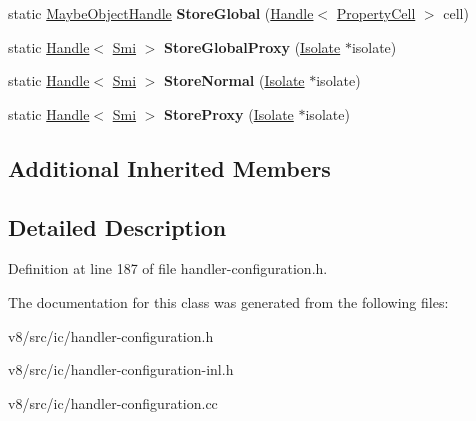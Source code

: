 \begin{DoxyCompactItemize}
\item 
\mbox{\label{classv8_1_1internal_1_1StoreHandler_a67ff02217ff0b7e1f3024b5b75705229}} 
static \mbox{\hyperlink{classv8_1_1internal_1_1MaybeObjectHandle}{Maybe\+Object\+Handle}} {\bfseries Store\+Global} (\mbox{\hyperlink{classv8_1_1internal_1_1Handle}{Handle}}$<$ \mbox{\hyperlink{classv8_1_1internal_1_1PropertyCell}{Property\+Cell}} $>$ cell)
\item 
\mbox{\label{classv8_1_1internal_1_1StoreHandler_a32b7371d227e63752e2739895810cc1f}} 
static \mbox{\hyperlink{classv8_1_1internal_1_1Handle}{Handle}}$<$ \mbox{\hyperlink{classv8_1_1internal_1_1Smi}{Smi}} $>$ {\bfseries Store\+Global\+Proxy} (\mbox{\hyperlink{classv8_1_1internal_1_1Isolate}{Isolate}} $\ast$isolate)
\item 
\mbox{\label{classv8_1_1internal_1_1StoreHandler_a16b1eb56c827571852da4f896218a31b}} 
static \mbox{\hyperlink{classv8_1_1internal_1_1Handle}{Handle}}$<$ \mbox{\hyperlink{classv8_1_1internal_1_1Smi}{Smi}} $>$ {\bfseries Store\+Normal} (\mbox{\hyperlink{classv8_1_1internal_1_1Isolate}{Isolate}} $\ast$isolate)
\item 
\mbox{\label{classv8_1_1internal_1_1StoreHandler_a568f97d10e381447e6d746d9996a43eb}} 
static \mbox{\hyperlink{classv8_1_1internal_1_1Handle}{Handle}}$<$ \mbox{\hyperlink{classv8_1_1internal_1_1Smi}{Smi}} $>$ {\bfseries Store\+Proxy} (\mbox{\hyperlink{classv8_1_1internal_1_1Isolate}{Isolate}} $\ast$isolate)
\end{DoxyCompactItemize}
\subsection*{Additional Inherited Members}


\subsection{Detailed Description}


Definition at line 187 of file handler-\/configuration.\+h.



The documentation for this class was generated from the following files\+:\begin{DoxyCompactItemize}
\item 
v8/src/ic/handler-\/configuration.\+h\item 
v8/src/ic/handler-\/configuration-\/inl.\+h\item 
v8/src/ic/handler-\/configuration.\+cc\end{DoxyCompactItemize}
